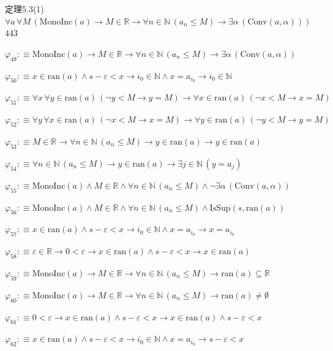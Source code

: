 \begin{fullproof}{定理5.3(1)}{$\forall a\,\forall M\,(\mathrm{MonoInc}(a) \to M \in \mathbb{R} \to \forall n \in \mathbb{N}\,(a_{n} \leq M) \to \exists \alpha\,(\mathrm{Conv}(a,\alpha)))$}{443}
\begin{abbrevlist}
\item $\varphi_{49} :\equiv \mathrm{MonoInc}(a) \to M \in \mathbb{R} \to \forall n \in \mathbb{N}\,(a_{n} \leq M) \to \exists \alpha\,(\mathrm{Conv}(a,\alpha))$
\item $\varphi_{50} :\equiv x \in \mathrm{ran}(a) \land s - \varepsilon < x \to i_{0} \in \mathbb{N} \land x = a_{i_{0}} \to i_{0} \in \mathbb{N}$
\item $\varphi_{51} :\equiv \forall x\,\forall y \in \mathrm{ran}(a)\,(\neg y < M \to y = M) \to \forall x \in \mathrm{ran}(a)\,(\neg x < M \to x = M)$
\item $\varphi_{52} :\equiv \forall y\,\forall x \in \mathrm{ran}(a)\,(\neg x < M \to x = M) \to \forall y \in \mathrm{ran}(a)\,(\neg y < M \to y = M)$
\item $\varphi_{53} :\equiv M \in \mathbb{R} \to \forall n \in \mathbb{N}\,(a_{n} \leq M) \to y \in \mathrm{ran}(a) \to y \in \mathrm{ran}(a)$
\item $\varphi_{54} :\equiv \forall n \in \mathbb{N}\,(a_{n} \leq M) \to y \in \mathrm{ran}(a) \to \exists j \in \mathbb{N}\,(y = a_{j})$
\item $\varphi_{55} :\equiv \mathrm{MonoInc}(a) \land M \in \mathbb{R} \land \forall n \in \mathbb{N}\,(a_{n} \leq M) \land \neg \exists \alpha\,(\mathrm{Conv}(a,\alpha))$
\item $\varphi_{56} :\equiv \mathrm{MonoInc}(a) \land M \in \mathbb{R} \land \forall n \in \mathbb{N}\,(a_{n} \leq M) \land \mathrm{IsSup}(s,\mathrm{ran}(a))$
\item $\varphi_{57} :\equiv x \in \mathrm{ran}(a) \land s - \varepsilon < x \to i_{0} \in \mathbb{N} \land x = a_{i_{0}} \to x = a_{i_{0}}$
\item $\varphi_{58} :\equiv \varepsilon \in \mathbb{R} \to 0 < \varepsilon \to x \in \mathrm{ran}(a) \land s - \varepsilon < x \to x \in \mathrm{ran}(a)$
\item $\varphi_{59} :\equiv \mathrm{MonoInc}(a) \to M \in \mathbb{R} \to \forall n \in \mathbb{N}\,(a_{n} \leq M) \to \mathrm{ran}(a) \subseteq \mathbb{R}$
\item $\varphi_{60} :\equiv \mathrm{MonoInc}(a) \to M \in \mathbb{R} \to \forall n \in \mathbb{N}\,(a_{n} \leq M) \to \mathrm{ran}(a) \neq \emptyset$
\item $\varphi_{61} :\equiv 0 < \varepsilon \to x \in \mathrm{ran}(a) \land s - \varepsilon < x \to x \in \mathrm{ran}(a) \land s - \varepsilon < x$
\item $\varphi_{62} :\equiv x \in \mathrm{ran}(a) \land s - \varepsilon < x \to i_{0} \in \mathbb{N} \land x = a_{i_{0}} \to s - \varepsilon < x$

\end{abbrevlist}
\end{fullproof}
